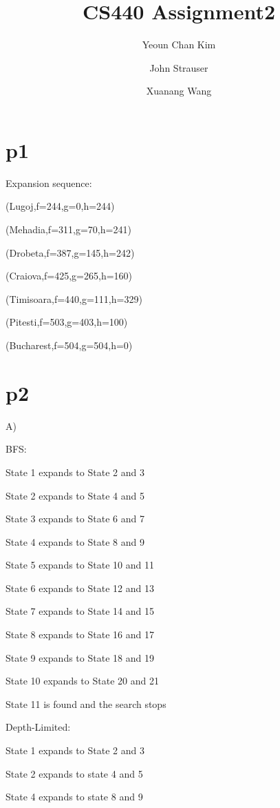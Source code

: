 \documentclass{article}
\author{Yeoun Chan Kim \and John Strauser \and Xuanang Wang}
\title{CS440 Assignment2}
\begin{document}
\maketitle

\section*{p1}

\hspace{5mm}

Expansion sequence:

(Lugoj,f=244,g=0,h=244)

(Mehadia,f=311,g=70,h=241)

(Drobeta,f=387,g=145,h=242)

(Craiova,f=425,g=265,h=160)

(Timisoara,f=440,g=111,h=329)

(Pitesti,f=503,g=403,h=100)

(Bucharest,f=504,g=504,h=0)

\section*{p2}

\hspace{5mm}

A)

BFS:

State 1 expands to State 2 and 3

State 2 expands to State 4 and 5

State 3 expands to State 6 and 7

State 4 expands to State 8 and 9

State 5 expands to State 10 and 11

State 6 expands to State 12 and 13

State 7 expands to State 14 and 15

State 8 expands to State 16 and 17

State 9 expands to State 18 and 19

State 10 expands to State 20 and 21

State 11 is found and the search stops

\hspace{5mm}

Depth-Limited:

State 1 expands to State 2 and 3

State 2 expands to state 4 and 5

State 4 expands to state 8 and 9
\end{document}

